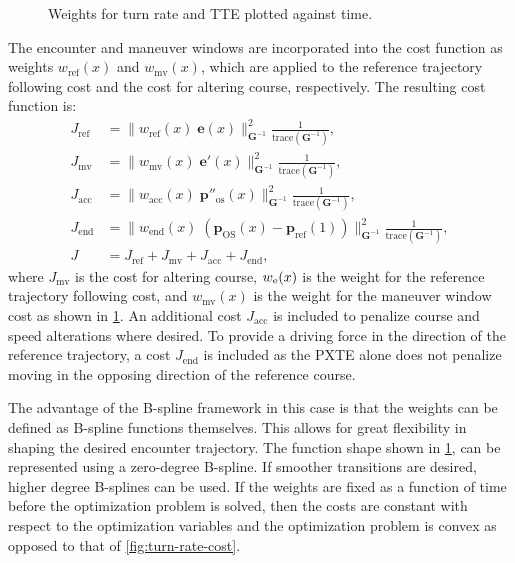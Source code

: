 \begin{figure}
    \centering
    
    \caption{Weights for turn rate and TTE plotted against time.}
    \label{fig:maneuver-window}
\end{figure}

The encounter and maneuver windows are incorporated into the cost function as weights $w_\text{ref}(x)$ and $w_\text{mv}(x)$, which are applied to the reference trajectory following cost and the cost for altering course, respectively. The resulting cost function is:
\begin{subequations}\label{eq:cost-maneuver-window}
    \begin{align}
        J_\text{ref} &= \|w_\text{ref}(x)\;\mathbf e(x)\|_{\mathbf G^{-1}}^2 \frac{1}{\text{trace}(\mathbf G^{-1})}, 
        \label{eq:cost-maneuver-window-ref}\\
        J_\text{mv} &= \|w_\text{mv}(x)\;\mathbf e'(x)\|_{\mathbf G^{-1}}^2 \frac{1}{\text{trace}(\mathbf G^{-1})},
        \label{eq:cost-maneuver-window-mv}\\
        J_\mathrm{acc} &= \|w_\text{acc}(x)\;\mathbf p''_\text{os}(x)\|_{\mathbf G^{-1}}^2 \frac{1}{\text{trace}(\mathbf G^{-1})}, \label{eq:cost-maneuver-window-acc}\\
        J_\mathrm{end} &= \|w_\text{end}(x)\;(\mathbf p_\text{OS}(x)-\mathbf p_\text{ref}(1))\|_{\mathbf G^{-1}}^2 \frac{1}{\text{trace}(\mathbf G^{-1})}, \label{eq:cost-maneuver-window-end}\\
        J &= J_\text{ref} + J_\text{mv} + J_\mathrm{acc} + J_\mathrm{end},
        \label{eq:cost-maneuver-window-total}
    \end{align}
\end{subequations}
where $J_\text{mv}$ is the cost for altering course, $w_\text e(x)$ is the weight for the reference trajectory following cost, and $w_\text{mv}(x)$ is the weight for the maneuver window cost as shown in \cref{fig:maneuver-window}. An additional cost $J_\mathrm{acc}$ is included to penalize course and speed alterations where desired. To provide a driving force in the direction of the reference trajectory, a cost $J_\mathrm{end}$ is included as the PXTE alone does not penalize moving in the opposing direction of the reference course. 

The advantage of the B-spline framework in this case is that the weights can be defined as B-spline functions themselves. This allows for great flexibility in shaping the desired encounter trajectory. The function shape shown in \cref{fig:maneuver-window}, can be represented using a zero-degree B-spline. If smoother transitions are desired, higher degree B-splines can be used.
If the weights are fixed as a function of time before the optimization problem is solved, then the costs are constant with respect to the optimization variables and the optimization problem is convex as opposed to that of \cref{fig:turn-rate-cost}.

